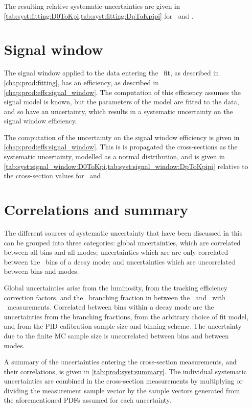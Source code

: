The resulting relative systematic uncertainties are given in 
\cref{tab:syst:fitting:D0ToKpi,tab:syst:fitting:DpToKpipi} for \DzToKpi\ and 
\DpToKpipi.

\section{Signal window}
\label{chap:prod:syst:signal_window}

The signal window applied to the data entering the \lnipchisq\ fit, as 
described in \cref{chap:prod:fitting}, has an efficiency, as described in 
\cref{chap:prod:effs:signal_window}.
The computation of this efficiency assumes the signal model is known, but the 
parameters of the model are fitted to the data, and so have an uncertainty, 
which results in a systematic uncertainty on the signal window efficiency.

The computation of the uncertainty on the signal window efficiency is given in
\cref{chap:prod:effs:signal_window}.
This is is propagated the cross-sections as the systematic uncertainty, 
modelled as a normal distribution, and is given in 
\cref{tab:syst:signal_window:D0ToKpi,tab:syst:signal_window:DpToKpipi} relative 
to the cross-section values for \DzToKpi\ and \DpToKpipi.

\section{Correlations and summary}
\label{chap:prod:syst:correlations}

The different sources of systematic uncertainty that have been discussed in 
this  can be grouped into three categories:
global uncertainties, which are correlated between all bins and all modes; 
uncertainties which are are only correlated
between the \pTy\ bins of a decay mode; and uncertainties which are 
uncorrelated between bins and modes.

Global uncertainties arise from the luminosity, from the tracking efficiency 
correction factors, and the \DzToKpi\ branching fraction in between the 
\DzToKpi\ and \DstToDzpi\ with \DzToKpi\ measurements.
Correlated between bins within a decay mode are the uncertainties from the 
branching fractions, from the arbitrary choice of fit model, and from the 
\ac{PID} calibration sample size and binning scheme.
The uncertainty due to the finite \ac{MC} sample size is uncorrelated between 
bins and between modes.

A summary of the uncertainties entering the cross-section measurements, and 
their correlations, is given in \cref{tab:prod:syst:summary}.
The individual systematic uncertainties are combined in the cross-section 
measurements by multiplying or dividing the measurement sample vector by the 
sample vectors generated from the aforementioned \acp{PDF} assumed for each 
uncertainty.

